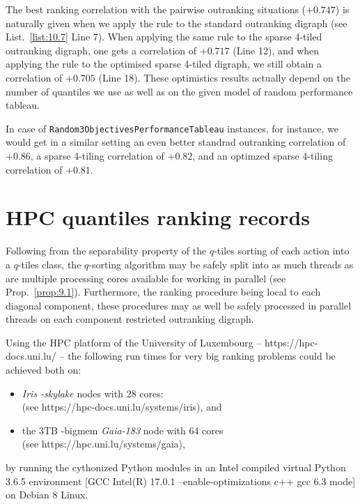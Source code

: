 The best ranking correlation with the pairwise outranking situations ($+0.747$) is naturally given when we apply the \Copeland rule to the standard outranking digraph (see List.~\vref{list:10.7} Line 7). When applying the same rule to the sparse 4-tiled outranking digraph, one gets a correlation of $+0.717$ (Line 12), and when applying the \Copeland rule to the optimised sparse 4-tiled digraph, we still obtain a correlation of $+0.705$ (Line 18). These optimistics results actually depend on the number of quantiles we use as well as on the given model of random performance tableau.

In case of \texttt{Random3ObjectivesPerformanceTableau} instances, for instance, we would get in a similar setting an even better standrad outranking correlation of $+0.86$, a sparse 4-tiling correlation of $+0.82$, and an optimzed sparse 4-tiling correlation of $+0.81$.

\section{HPC quantiles ranking records}
\label{sec:11.5}

Following from the separability property of the $q$-tiles sorting of each action into a $q$-tiles class, the $q$-sorting algorithm may be safely split into as much threads as are multiple processing cores available for working in parallel (see Prop.~\ref{prop:9.1}). Furthermore, the ranking procedure being local to each diagonal component, these procedures may as well be safely processed in parallel threads on each component restricted outranking digraph.

Using the HPC platform of the University of Luxembourg -- https://hpc-docs.uni.lu/ \citep{UNI-2014}-- the following run times for very big ranking problems could be achieved both on:
\begin{itemize}[topsep=1pt]
\item \emph{Iris -skylake} nodes with 28 cores:\\
  (see https://hpc-docs.uni.lu/systems/iris), and
\item the 3TB -bigmem \emph{Gaia-183} node with 64 cores \\
  (see https://hpc.uni.lu/systems/gaia),
\end{itemize}
by running the cythonized Python modules in an Intel compiled virtual Python 3.6.5 environment [GCC Intel(R) 17.0.1 –enable-optimizations c++ gcc 6.3 mode] on Debian 8 Linux.

